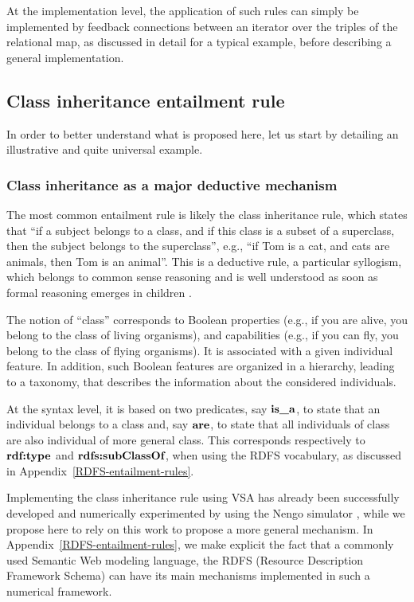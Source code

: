 \documentclass[sn-mathphys]{sn-jnl}
\begin{document}
At the implementation level, the application of such rules can simply be implemented by feedback connections between an iterator over the triples of the relational map, as discussed in detail for a typical example, before describing a general implementation.

\subsection{Class inheritance entailment rule} \label{inheritance}

In order to better understand what is proposed here, let us start by detailing an illustrative and quite universal example.

\subsubsection{Class inheritance as a major deductive mechanism}

The most common entailment rule is likely the class inheritance rule, which states that ``if a subject belongs to a class, and if this class is a subset of a superclass, then the subject belongs to the superclass'', e.g., ``if Tom is a cat, and cats are animals, then Tom is an animal''. This is a deductive rule, a particular syllogism, which belongs to common sense reasoning and is well understood as soon as formal reasoning emerges in children \cite{smith_development_1994}.

The notion of ``class'' corresponds to Boolean properties (e.g., if you are alive, you belong to the class of living organisms), and capabilities (e.g., if you can fly, you belong to the class of flying organisms). It is associated with a given individual feature. In addition, such Boolean features are organized in a hierarchy, leading to a taxonomy, that describes the information about the considered individuals.

At the syntax level, it is based on two predicates, say $\texttt{\bf is\_a}$, to state that an individual belongs to a class and, say $\texttt{\bf are}$, to state that all individuals of class are also individual of more general class. This corresponds respectively to $\texttt{\bf rdf:type}$ and $\texttt{\bf rdfs:subClassOf}$, when using the RDFS vocabulary, as discussed in Appendix~\ref{RDFS-entailment-rules}.

Implementing the class inheritance rule using VSA has already been successfully developed and numerically experimented by \cite{mercier_ontology_2021} using the Nengo simulator \cite{bekolay_nengo_2014}, while we propose here to rely on this work to propose a more general mechanism. In Appendix~\ref{RDFS-entailment-rules}, we make explicit the fact that a commonly used Semantic Web modeling language, the RDFS (Resource Description Framework Schema) can have its main mechanisms implemented in such a numerical framework.
\end{document}
